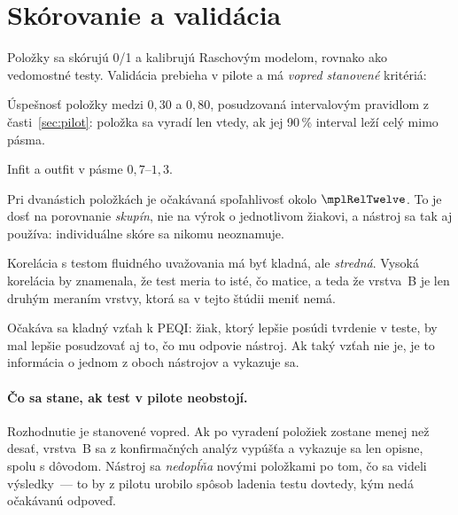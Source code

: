 \section{Skórovanie a validácia}

Položky sa skórujú 0/1 a kalibrujú Raschovým modelom, rovnako ako vedomostné testy. Validácia prebieha v pilote a má \emph{vopred stanovené} kritériá:

\begin{description}[leftmargin=0.6cm, nosep]
    \item[\textbf{Obtiažnosť.}] Úspešnosť položky medzi $0{,}30$ a $0{,}80$, posudzovaná intervalovým pravidlom z časti~\ref{sec:pilot}: položka sa vyradí len vtedy, ak jej 90\,\% interval leží celý mimo pásma.
    \item[\textbf{Zhoda s modelom.}] Infit a outfit v pásme $0{,}7$--$1{,}3$.
    \item[\textbf{Spoľahlivosť.}] Pri dvanástich položkách je očakávaná spoľahlivosť okolo $\mplRelTwelve$. To je dosť na porovnanie \emph{skupín}, nie na výrok o jednotlivom žiakovi, a nástroj sa tak aj používa: individuálne skóre sa nikomu neoznamuje.
    \item[\textbf{Rozlišovacia validita.}] Korelácia s testom fluidného uvažovania má byť kladná, ale \emph{stredná}. Vysoká korelácia by znamenala, že test meria to isté, čo matice, a teda že vrstva~B je len druhým meraním vrstvy, ktorá sa v tejto štúdii meniť nemá.
    \item[\textbf{Súbežná validita.}] Očakáva sa kladný vzťah k PEQI: žiak, ktorý lepšie posúdi tvrdenie v teste, by mal lepšie posudzovať aj to, čo mu odpovie nástroj. Ak taký vzťah nie je, je to informácia o jednom z oboch nástrojov a vykazuje sa.
\end{description}

\paragraph{Čo sa stane, ak test v pilote neobstojí.} Rozhodnutie je stanovené vopred. Ak po vyradení položiek zostane menej než desať, vrstva~B sa z konfirmačných analýz vypúšťa a vykazuje sa len opisne, spolu s dôvodom. Nástroj sa \emph{nedopĺňa} novými položkami po tom, čo sa videli výsledky~--- to by z pilotu urobilo spôsob ladenia testu dovtedy, kým nedá očakávanú odpoveď.
